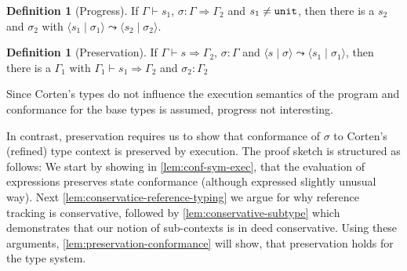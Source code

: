 \documentclass[twoside, english, final]{sdqthesis}
\newcommand{\tuple}[2]{\langle #1 \mid #2 \rangle}
\theoremstyle{definition}
\newtheorem{definition}[theorem]{Definition}
\begin{document}

\begin{definition}[Progress]
    If $\Gamma \vdash s_1$, $\sigma : \Gamma \Rightarrow \Gamma_2$ and $s_1 \neq \code{unit}$, then there is a $s_2$ and $\sigma_2$ with $\tuple{s_1}{\sigma_1} \leadsto \tuple{s_2}{\sigma_2}$.
\end{definition}

\begin{definition}[Preservation]
  If $\Gamma \vdash s \Rightarrow \Gamma_2$, $\sigma : \Gamma$ and $\tuple{s}{\sigma} \leadsto \tuple{s_1}{\sigma_1}$, then there is a $\Gamma_1$ with $\Gamma_1 \vdash s_1 \Rightarrow \Gamma_2$ and $\sigma_2 : \Gamma_2$
\end{definition}

Since Corten's types do not influence the execution semantics of the program and conformance for the base types is assumed, progress not interesting.

In contrast, preservation requires us to show that conformance of $\sigma$ to Corten's (refined) type context is preserved by execution. The proof sketch is structured as follows: We start by showing in \cref{lem:conf-sym-exec}, that the evaluation of expressions preserves state conformance (although expressed slightly unusual way). 
Next \cref{lem:conservatice-reference-typing} we argue for why reference tracking is conservative, followed by \cref{lem:conservative-subtype} which demonstrates that our notion of sub-contexts is in deed conservative. Using these arguments, \cref{lem:preservation-conformance} will show, that preservation holds for the type system.
\end{document}

